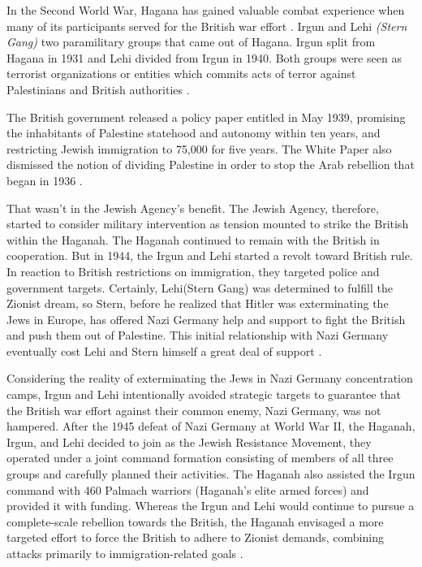 In the Second World War, Hagana has gained valuable combat experience when many of its participants served for the British war effort \citep{Pappe2006}. Irgun and Lehi \textit{(Stern Gang)} two paramilitary groups that came out of Hagana. Irgun split from Hagana in 1931 and Lehi divided from Irgun in 1940\citep{Shlaim2014}. Both groups were seen as terrorist organizations or entities which commits acts of terror against Palestinians and British authorities \citep{Bell1976}.   


The British government released a policy paper entitled  in May 1939, promising the inhabitants of Palestine statehood and autonomy within ten years, and restricting Jewish immigration to 75,000 for five years. The White Paper also dismissed the notion of dividing Palestine in order to stop the Arab rebellion that began in 1936 \citep{Morris2004, Fenby2018}.

That wasn't in the Jewish Agency's benefit. The Jewish Agency, therefore, started to consider military intervention as tension mounted to strike the British within the Haganah. The Haganah continued to remain with the British in cooperation. But in 1944, the Irgun and Lehi started a revolt toward British rule. In reaction to British restrictions on immigration, they targeted police and government targets.
Certainly, Lehi(Stern Gang) was determined to fulfill the Zionist dream, so Stern, before he realized that Hitler was exterminating the Jews in Europe, has offered Nazi Germany help and support to fight the British and push them out of Palestine. This initial relationship with Nazi Germany eventually cost Lehi and Stern himself a great deal of support \citep{Shlaim2014, Heller1995, Grob-Fitzgibbon2011}. 

Considering the reality of exterminating the Jews in Nazi Germany concentration camps, Irgun and Lehi intentionally avoided strategic targets to guarantee that the British war effort against their common enemy, Nazi Germany, was not hampered. After the 1945 defeat of Nazi Germany at World War II, the Haganah, Irgun, and Lehi decided to join as the Jewish Resistance Movement, they operated under a joint command formation consisting of members of all three groups and carefully planned their activities. The Haganah also assisted the Irgun command with 460 Palmach warriors (Haganah's elite armed forces) and provided it with funding. Whereas the Irgun and Lehi would continue to pursue a complete-scale rebellion towards the British, the Haganah envisaged a more targeted effort to force the British to adhere to Zionist demands, combining attacks primarily to immigration-related goals \citep{Bell1976, Shlaim2014}.

